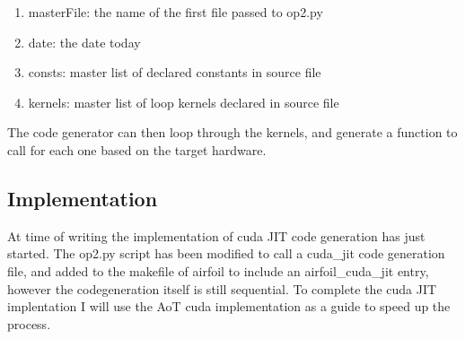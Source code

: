 \documentclass[11pt]{article}
\begin{document}
\begin{enumerate}
\item{masterFile: the name of the first file passed to op2.py}
\item{date: the date today}
\item{consts: master list of declared constants in source file}
\item{kernels: master list of loop kernels declared in source file}
\end{enumerate}
The code generator can then loop through the kernels, and generate a function to call for each one based on the target hardware.

\subsection*{Implementation}
At time of writing the implementation of cuda JIT code generation has just started. The op2.py script has been modified to call a cuda\_jit code generation file, and added to the makefile of airfoil to include an airfoil\_cuda\_jit entry, however the codegeneration itself is still sequential. To complete the cuda JIT implentation I will use the AoT cuda implementation as a guide to speed up the process.
\end{document}
